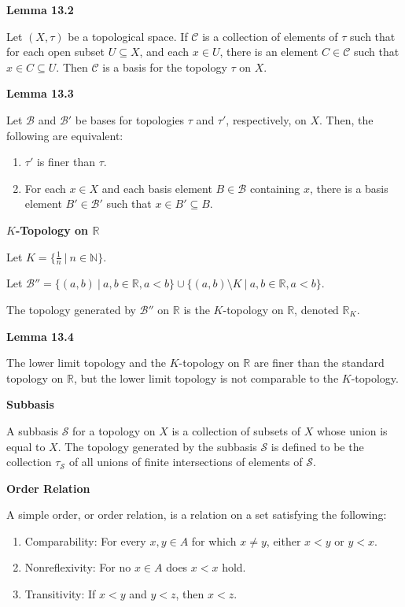 \documentclass{article}
\newcommand{\R}{\mathbb R}
\begin{document}
\medskip\noindent\textbf{Lemma 13.2}

    Let $(X,\tau)$ be a topological space. If $\mathcal C$ is a collection of elements of $\tau$ such that for each open subset $U \subseteq X$, and each $x \in U$, there is an element $C \in \mathcal C$ such that $x \in C \subseteq U$. Then $\mathcal C$ is a basis for the topology $\tau$ on $X$.

\medskip\noindent\textbf{Lemma 13.3}

    Let $\mathcal B$ and $\mathcal B'$ be bases for topologies $\tau$ and $\tau'$, respectively, on $X$. Then, the following are equivalent:

    \begin{enumerate}
        \item $\tau'$ is finer than $\tau$.
        \item For each $x \in X$ and each basis element $B \in \mathcal B$ containing $x$, there is a basis element $B' \in \mathcal B'$ such that $x \in B' \subseteq B$.
    \end{enumerate}

\medskip\noindent\textbf{$K$-Topology on $\mathbb R$}

    Let $K = \{\frac1n~|~n\in\mathbb N\}$.

    Let $\mathcal B'' = \{(a,b)~|~a,b\in \mathbb R,a<b\} \cup \{(a,b)\setminus K~|~a,b\in\mathbb R,a<b\}.$

    The topology generated by $\mathcal B''$ on $\mathbb R$ is the $K$-topology on $\mathbb R$, denoted $\R_K$.

\medskip\noindent\textbf{Lemma 13.4}

    The lower limit topology and the $K$-topology on $\mathbb R$ are finer than the standard topology on $\mathbb R$, but the lower limit topology is not comparable to the $K$-topology.

\medskip\noindent\textbf{Subbasis}

A subbasis $\mathcal S$ for a topology on $X$ is a collection of subsets of $X$ whose union is equal to $X$. The topology generated by the subbasis $\mathcal S$ is defined to be the collection $\tau_{\mathcal S}$ of all unions of finite intersections of elements of $\mathcal S$.

\medskip\noindent\textbf{Order Relation}

    A simple order, or order relation, is a relation on a set satisfying the following:
    \begin{enumerate}
        \item Comparability: For every $x,y \in A$ for which $x \neq y$, either $x < y$ or $y < x$.
        \item Nonreflexivity: For no $x \in A$ does $x < x$ hold.
        \item Transitivity: If $x<y$ and $y<z$, then $x<z$.
    \end{enumerate}
\end{document}
